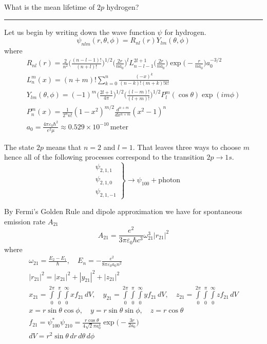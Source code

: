 \documentclass[12pt]{article}
\begin{document}
What is the mean lifetime of $2p$ hydrogen?

\bigskip
\hrule

\bigskip
Let us begin by writing down the wave function $\psi$ for hydrogen.
\begin{equation*}
\psi_{nlm}(r,\theta,\phi)=R_{nl}(r)Y_{lm}(\theta,\phi)
\end{equation*}
where
\begin{gather*}
R_{nl}(r)=
\frac{2}{n^2}
\bigg(\frac{(n-l-1)!}{(n+l)!}\bigg)^{1/2}
\bigg(\frac{2r}{na_0}\bigg)^l
L_{n-l-1}^{2l+1}\bigg(\frac{2r}{na_0}\bigg)
\exp\bigg(-\frac{r}{na_0}\bigg)
a_0^{-3/2}
\\
L_n^m(x)=(n+m)!\sum_{k=0}^n\frac{(-x)^k}{(n-k)!(m+k)!k!}
\\
Y_{lm}(\theta,\phi)=(-1)^m
\bigg(\frac{2l+1}{4\pi}\bigg)^{1/2}
\bigg(\frac{(l-m)!}{(l+m)!}\bigg)^{1/2}
P_l^m(\cos\theta)\exp(im\phi)
\\
P_n^m(x)=\frac{1}{2^n n!}(1-x^2)^{m/2}\frac{d^{n+m}}{dx^{n+m}}(x^2-1)^n
\\
a_0=\frac{4\pi\varepsilon_0\hbar^2}{e^2\mu}\approx0.529\times10^{-10}\,\text{meter}
\end{gather*}

The state $2p$ means that $n=2$ and $l=1$.
That leaves three ways to choose $m$ hence all of the following processes correspond to the transition
$2p\rightarrow1s$.
\begin{equation*}
\left.\begin{aligned}
&\psi_{2,1,1}
\\
&\psi_{2,1,0}
\\
&\psi_{2,1,-1}
\end{aligned}\right\}\rightarrow\psi_{100}+\text{photon}
\end{equation*}

By Fermi's Golden Rule and dipole approximation we have
for spontaneous emission rate $A_{21}$
\begin{equation*}
A_{21}=\frac{e^2}{3\pi\varepsilon_0\hbar c^3}\omega_{21}^3|r_{21}|^2
\tag{1}
\end{equation*}
where
\begin{gather*}
\omega_{21}=\frac{E_2-E_1}{\hbar},\quad E_n=-\frac{e^2}{8\pi\varepsilon_0a_0n^2}
\\
|r_{21}|^2=|x_{21}|^2+|y_{21}|^2+|z_{21}|^2
\\
x_{21}=\int\limits_{0}^{2\pi}\int\limits_{0}^{\pi}\int\limits_{0}^{\infty}xf_{21}\,dV,
\quad
y_{21}=\int\limits_{0}^{2\pi}\int\limits_{0}^{\pi}\int\limits_{0}^{\infty}yf_{21}\,dV,
\quad
z_{21}=\int\limits_{0}^{2\pi}\int\limits_{0}^{\pi}\int\limits_{0}^{\infty}zf_{21}\,dV
\\
x=r\sin\theta\cos\phi,
\quad
y=r\sin\theta\sin\phi,
\quad
z=r\cos\theta
\\
f_{21}=\psi_{100}^*\psi_{210}=\frac{r\cos\theta}{4\sqrt2\pi a_0^4}\exp\bigg({-}\frac{3r}{2a_0}\bigg)
\\
dV=r^2\sin\theta\,dr\,d\theta\,d\phi
\end{gather*}
\end{document}
